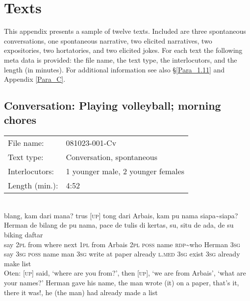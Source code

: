 \chapter{Texts}
\label{Para_B}
This appendix presents a sample of twelve texts. Included are three spontaneous conversations, one spontaneous narrative, two elicited narratives, two expositories, two hortatories, and two elicited jokes. For each text the following meta data is provided: the file name, the text type, the interlocutors, and the length (in minutes). For additional information see also §\ref{Para_1.11} and Appendix \ref{Para_C}.

\section{Conversation: Playing volleyball; morning chores}
\label{Para_B.1}
\begin{tabular}{ll}
File name: & 081023-001-Cv\\
Text type: &  Conversation, spontaneous\\
Interlocutors: &  1 younger male, 2 younger females\\
Length (min.): &  4:52\\

\end{tabular}\\

\renewcommand{\Tilde}{\textasciitilde}
\ea
{}
\gll {\upshape\textsc{[up]}} {blang,} {kam} {dari} {mana?} {trus} {\upshape\textsc{[up]}} {tong} {dari} {Arbais,} {kam} {pu} {nama} {siapa{\textasciitilde}siapa?} {Herman} {de} {bilang}  de pu {nama,} {pace} {de} {tulis} {di} {kertas,} {su,} {situ} {de} ada, {de} {su} {biking} {daftar}\\
     {} {say} {\textsc{2pl}} {from} {where} {next} {} {\textsc{1pl}} {from}                  {Arbais} {\textsc{2pl}} {\textsc{poss}} {name} {\textsc{rdp}{\Tilde}who} {Herman} {\textsc{3sg}} {say} \textsc{3sg}  \textsc{poss} {name} {man} {\textsc{3sg}} {write} {at} {paper} {already} {\textsc{l.med}} {\textsc{3sg}} exist {\textsc{3sg}} {already} {make} {list}\\
     \glt 
Oten: [\textsc{up}] said, ‘where are you from?’, then [\textsc{up}], ‘we are from Arbais’, ‘what are your names?’ Herman gave his name, the man wrote (it) on a paper, that’s it, there it was!, he (the man) had already made a list
\z

